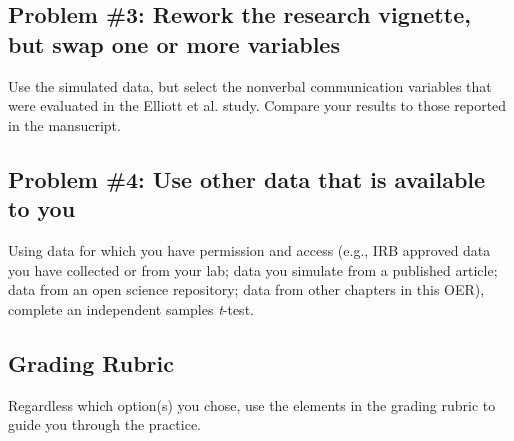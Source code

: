 \documentclass[
  11pt,
]{book}
\begin{document}
\hypertarget{problem-3-rework-the-research-vignette-but-swap-one-or-more-variables}{%
\subsection{Problem \#3: Rework the research vignette, but swap one or more variables}\label{problem-3-rework-the-research-vignette-but-swap-one-or-more-variables}}

Use the simulated data, but select the nonverbal communication variables that were evaluated in the Elliott et al. \citeyearpar{elliott_differences_2016}study. Compare your results to those reported in the mansucript.

\hypertarget{problem-4-use-other-data-that-is-available-to-you}{%
\subsection{Problem \#4: Use other data that is available to you}\label{problem-4-use-other-data-that-is-available-to-you}}

Using data for which you have permission and access (e.g., IRB approved data you have collected or from your lab; data you simulate from a published article; data from an open science repository; data from other chapters in this OER), complete an independent samples \emph{t}-test.

\hypertarget{grading-rubric-1}{%
\subsection{Grading Rubric}\label{grading-rubric-1}}

Regardless which option(s) you chose, use the elements in the grading rubric to guide you through the practice.
\end{document}
